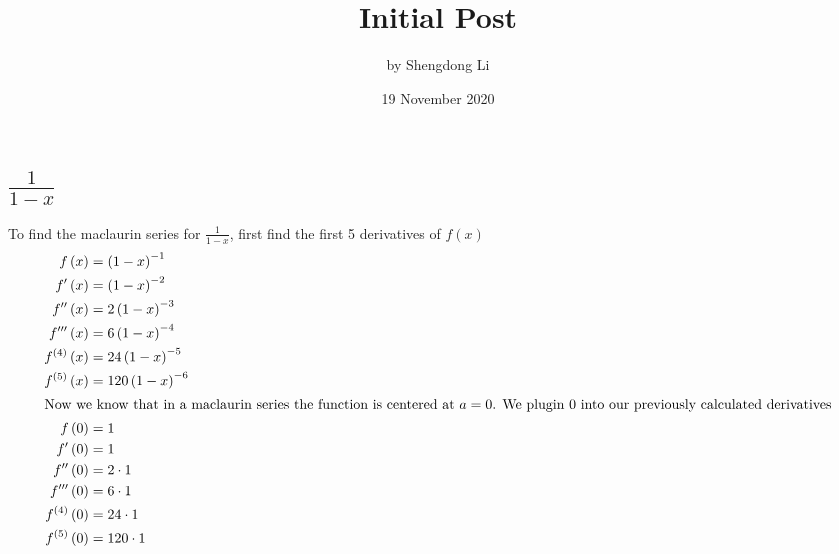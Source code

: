 \documentclass[12pt]{article}
\begin{document}
\title{Initial Post}
\author{by Shengdong Li}
\date{19 November 2020}
\maketitle

\section{\texorpdfstring{$\frac{1}{1-x}$}{Lg}}
To find the maclaurin series for $\frac{1}{1-x}$, first find the first 5 derivatives of $f(x)$
\begin{align}
  f\left(x\right)                  & =\left(1-x\right)^{-1}                                                                \\
  f'\left(x\right)                 & =\left(1-x\right)^{-2}                                                                \\
  f''\left(x\right)                & =2\left(1-x\right)^{-3}                                                               \\
  f'''\left(x\right)               & =6\left(1-x\right)^{-4}                                                               \\
  f^{\left(4\right)}\left(x\right) & =24\left(1-x\right)^{-5}                                                              \\
  f^{\left(5\right)}\left(x\right) & =120\left(1-x\right)^{-6}                                                             \\
  \intertext{Now we know that in a maclaurin series the function is centered at $a=0$. We plugin $0$ into our previously calculated derivatives}
  f\left(0\right)                  & =1                                                                                    \\
  f'\left(0\right)                 & =1                                                                                    \\
  f''\left(0\right)                & =2\cdot1                                                                              \\
  f'''\left(0\right)               & =6\cdot1                                                                              \\
  f^{\left(4\right)}\left(0\right) & =24\cdot1                                                                             \\
  f^{\left(5\right)}\left(0\right) & =120\cdot1                                                                            
\end{align}
\end{document}
